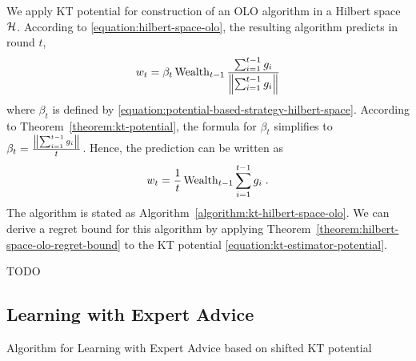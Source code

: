 We apply KT potential for construction of an OLO algorithm in a Hilbert
space $\mathcal{H}$. According to \eqref{equation:hilbert-space-olo}, the resulting algorithm predicts
in round $t$,
$$
w_t = \beta_t \operatorname{Wealth}_{t-1} \frac{\sum_{i=1}^{t-1} g_i}{\left\|{\sum_{i=1}^{t-1} g_i}\right\|}
$$
where $\beta_t$ is defined by
\eqref{equation:potential-based-strategy-hilbert-space}. According to
Theorem~\ref{theorem:kt-potential}, the formula for $\beta_t$ simplifies to
$\beta_t = \frac{\left\|{\sum_{i=1}^{t-1} g_i}\right\|}{t}$. Hence, the prediction can be
written as
$$
w_t = \frac{1}{t} \operatorname{Wealth}_{t-1} \sum_{i=1}^{t-1} g_i \; .
$$
The algorithm is stated as Algorithm~\ref{algorithm:kt-hilbert-space-olo}. We
can derive a regret bound for this algorithm by applying
Theorem~\ref{theorem:hilbert-space-olo-regret-bound} to the KT potential
\eqref{equation:kt-estimator-potential}.

\begin{corollary}
TODO
\end{corollary}


\subsection{Learning with Expert Advice}

\begin{algorithm}
\begin{algorithmic}
\caption{Algorithm for Learning with Expert Advice based on shifted KT potential
\label{algorithm:kt-experts}}
{
\ENDFOR
}
\end{algorithmic}
\end{algorithm}

